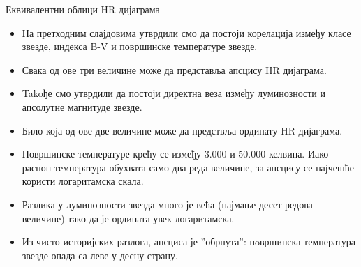 \documentclass[aspectratio=169, xcolor=table, 10pt]{beamer}
\begin{document}
\begin{frame}{Еквивалентни облици HR дијаграма}
  \begin{itemize}
    \item На претходним слајдовима утврдили смо да постоји корелација између класе звезде, индекса B-V и површинске температуре звезде.
    \item Свака од ове три величине може да представља апсцису HR дијаграма.
    \item Takoђе смо утврдили да постоји директна веза између луминозности и апсолутне магнитуде звезде.
    \item Било која од ове две величине може да предствља ординату HR дијаграма.
    \item Површинске температуре крећу се између 3.000 и 50.000 келвина. Иако распон температура обухвата само два реда величине, за апсцису се најчешће користи логаритамска скала.
    \item Разлика у луминозности звезда много је већа (најмање десет редова величине) тако да је ордината увек логаритамска.
    \item Из чисто историјских разлога, апсциса је ”обрнута”: пoвршинска температура звезде опада са леве у десну страну.
  \end{itemize}
\end{frame}
\end{document}
